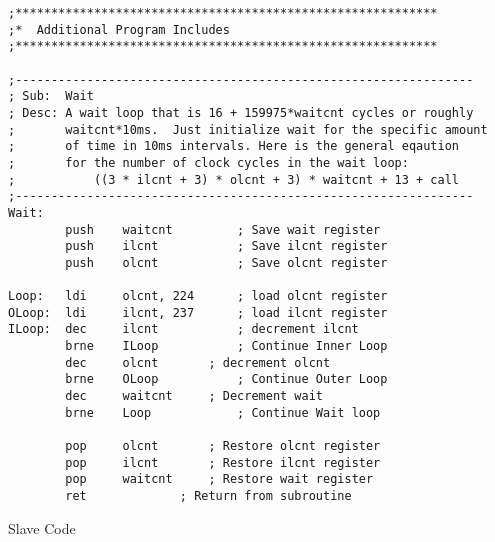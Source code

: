 \documentclass[12pt,letterpaper]{article}
\begin{document}
\begin{verbatim}
;***********************************************************
;*	Additional Program Includes
;***********************************************************

;----------------------------------------------------------------
; Sub:  Wait
; Desc: A wait loop that is 16 + 159975*waitcnt cycles or roughly 
;       waitcnt*10ms.  Just initialize wait for the specific amount 
;       of time in 10ms intervals. Here is the general eqaution
;       for the number of clock cycles in the wait loop:
;           ((3 * ilcnt + 3) * olcnt + 3) * waitcnt + 13 + call
;----------------------------------------------------------------
Wait:
        push    waitcnt         ; Save wait register
        push    ilcnt           ; Save ilcnt register
        push    olcnt           ; Save olcnt register

Loop:   ldi     olcnt, 224      ; load olcnt register
OLoop:  ldi     ilcnt, 237      ; load ilcnt register
ILoop:  dec     ilcnt           ; decrement ilcnt
        brne    ILoop           ; Continue Inner Loop
        dec     olcnt       ; decrement olcnt
        brne    OLoop           ; Continue Outer Loop
        dec     waitcnt     ; Decrement wait 
        brne    Loop            ; Continue Wait loop    

        pop     olcnt       ; Restore olcnt register
        pop     ilcnt       ; Restore ilcnt register
        pop     waitcnt     ; Restore wait register
        ret             ; Return from subroutine
\end{verbatim}
Slave Code
\end{document}
